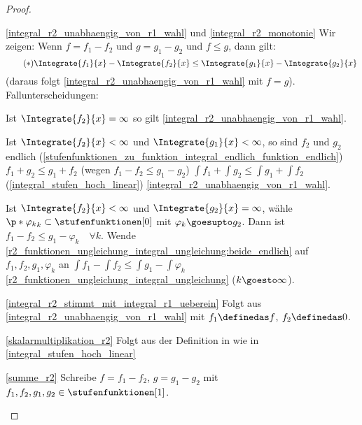 \begin{proof}
  \begin{proofdescription}
    \item[\ref{integral_r2_unabhaengig_von_r1_wahl} und \ref{integral_r2_monotonie}] Wir zeigen: Wenn \( f=f_1-f_2 \) und \( g=g_1-g_2 \) und \( f\leq g \), dann gilt:
    \begin{equation*}
      \tag{\( * \)} \Integrate{f_1}{x}-\Integrate{f_2}{x}\leq \Integrate{g_1}{x}-\Integrate{g_2}{x}\label{r2_funktionen_ungleichung_integral_ungleichung}
    \end{equation*}
    (daraus folgt \ref{integral_r2_unabhaengig_von_r1_wahl} mit \( f=g \)). Fallunterscheidungen:
    \begin{eigenschaftenenumerate}[ref=\rechtsklammer{\alph*}]
      \item Ist \( \Integrate{f_2}{x}=\infty \) so gilt \eqref{integral_r2_unabhaengig_von_r1_wahl}.
      \item\label{r2_funktionen_ungleichung_integral_ungleichung:beide_endlich} Ist \( \Integrate{f_2}{x}<\infty \) und \( \Integrate{g_1}{x}<\infty \), so sind \( f_2 \) und \( g_2 \) endlich \fue (\ref{stufenfunktionen_zu_funktion_integral_endlich_funktion_endlich}) \timplies \( f_1+g_2\leq g_1+f_2 \) (wegen \( f_1-f_2\leq g_1-g_2 \)) \timplies \( \int f_1+\int g_2\leq \int g_1+\int f_2 \) (\ref{integral_stufen_hoch_linear}) \timplies \eqref{integral_r2_unabhaengig_von_r1_wahl}.
      \item Ist \( \Integrate{f_2}{x}<\infty \) und \( \Integrate{g_2}{x}=\infty \), wähle \( \p*{\varphi_k}_k\subset \stufenfunktionen[0] \) mit \( \varphi_k\goesupto g_2 \). Dann ist \( f_1-f_2\leq g_1-\varphi_k \quad \forall k \). Wende \ref{r2_funktionen_ungleichung_integral_ungleichung:beide_endlich} auf \( f_1,f_2,g_1,\varphi_k \) an \timplies \( \int f_1-\int f_2\leq \int g_1-\int \varphi_k \) \timplies \eqref{r2_funktionen_ungleichung_integral_ungleichung} (\( k\goesto \infty \)).
    \end{eigenschaftenenumerate}
    \item[\ref{integral_r2_stimmt_mit_integral_r1_ueberein}] Folgt aus \ref{integral_r2_unabhaengig_von_r1_wahl} mit \( f_1\definedas f \), \( f_2\definedas 0 \).
    \item[\ref{skalarmultiplikation_r2}] Folgt aus der Definition in wie in \ref{integral_stufen_hoch_linear}
    \item[\ref{summe_r2}] Schreibe \( f=f_1-f_2 \), \( g=g_1-g_2 \) mit \( f_1,f_2,g_1,g_2\in \stufenfunktionen[1] \).  
    \begin{eigenschaftenenumerate}[ref=\rechtsklammer{\alph*}]

\end{eigenschaftenenumerate}
\end{proofdescription}
\end{proof}
